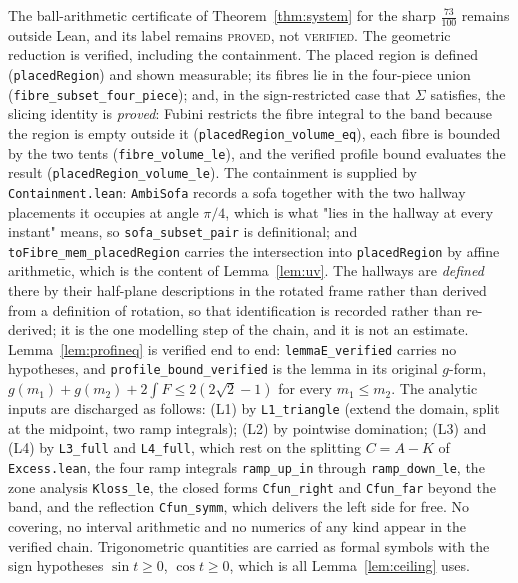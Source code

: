 \documentclass[11pt]{article}
\theoremstyle{definition}
\newcommand{\Sig}{\Sigma}
\begin{document}
The ball-arithmetic certificate of Theorem~\ref{thm:system} for the sharp
$\tfrac{73}{100}$ remains outside Lean, and its label remains \textsc{proved}, not
\textsc{verified}. The geometric reduction is verified, including the containment. The
placed region is defined (\verb|placedRegion|) and shown measurable; its fibres lie in
the four-piece union (\verb|fibre_subset_four_piece|); and, in the sign-restricted case
that $\Sig$ satisfies, the slicing identity is \emph{proved}: Fubini restricts the fibre
integral to the band because the region is empty outside it
(\verb|placedRegion_volume_eq|), each fibre is bounded by the two tents
(\verb|fibre_volume_le|), and the verified profile bound evaluates the result
(\verb|placedRegion_volume_le|). The containment is supplied by \verb|Containment.lean|:
\verb|AmbiSofa| records a sofa together with the two hallway placements it occupies at
angle $\pi/4$, which is what "lies in the hallway at every instant" means, so
\verb|sofa_subset_pair| is definitional; and \verb|toFibre_mem_placedRegion| carries the
intersection into \verb|placedRegion| by affine arithmetic, which is the content of
Lemma~\ref{lem:uv}. The hallways are \emph{defined} there by their half-plane
descriptions in the rotated frame rather than derived from a definition of rotation, so
that identification is recorded rather than re-derived; it is the one modelling step of
the chain, and it is not an estimate. Lemma~\ref{lem:profineq} is verified end to end: \verb|lemmaE_verified| carries no
hypotheses, and \verb|profile_bound_verified| is the lemma in its original $g$-form,
$g(m_1)+g(m_2)+2\int F\le2(2\sqrt2-1)$ for every $m_1\le m_2$. The analytic inputs are
discharged as follows: (L1) by \verb|L1_triangle| (extend the domain, split at the
midpoint, two ramp integrals); (L2) by pointwise domination; (L3) and (L4) by
\verb|L3_full| and \verb|L4_full|, which rest on the splitting $C=A-K$ of
\verb|Excess.lean|, the four ramp integrals \verb|ramp_up_in| through
\verb|ramp_down_le|, the zone analysis \verb|Kloss_le|, the closed forms
\verb|Cfun_right| and \verb|Cfun_far| beyond the band, and the reflection
\verb|Cfun_symm|, which delivers the left side for free. No covering, no interval
arithmetic and no numerics of any kind appear in the verified chain. Trigonometric quantities are carried as formal symbols with
the sign hypotheses $\sin t\ge0$, $\cos t\ge0$, which is all
Lemma~\ref{lem:ceiling} uses.
\end{document}
